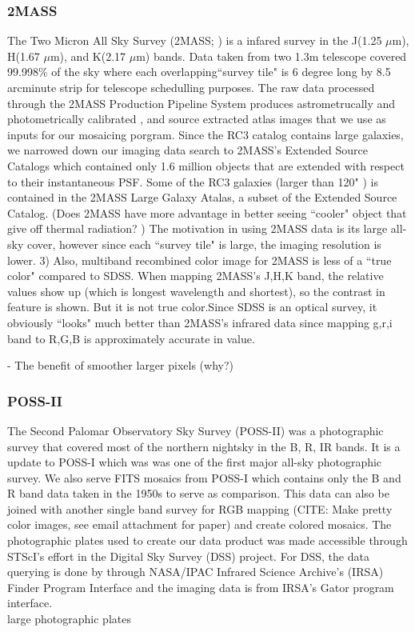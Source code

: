 \documentclass[5p]{elsarticle}
\begin{document}
	\subsubsection{2MASS}
	 The Two Micron All Sky Survey (2MASS; \citet{2mass}) is a infared survey in the J(1.25 $\mu$m), H(1.67 $\mu$m), and K(2.17 $\mu$m) bands. Data taken from two 1.3m telescope  covered 99.998\% of the sky where each overlapping``survey tile" is 6 degree long by 8.5 arcminute strip for telescope schedulling purposes. The raw data processed through the 2MASS Production Pipeline System produces astrometrucally and photometrically calibrated , and source extracted atlas images that we use as inputs for our mosaicing porgram. Since the RC3 catalog contains large galaxies, we narrowed down our imaging data search to  2MASS's  Extended Source Catalogs which contained only 1.6 million objects that are extended with respect to their instantaneous PSF. %
	 Some of the RC3 galaxies (larger than 120" ) is contained in the 2MASS Large Galaxy Atalas, a subset of the Extended Source Catalog.	(Does 2MASS have more advantage in better seeing ``cooler" object that give off thermal radiation? ) The motivation in using 2MASS data is its large all-sky cover, however since each ``survey tile" is large, the imaging resolution is lower. 3) Also, multiband recombined color image for 2MASS is less of a ``true color" compared to SDSS. When mapping 2MASS's J,H,K band, the relative values show up (which is longest wavelength and shortest), so the contrast in feature is shown. But it is not true color.Since  SDSS is an optical survey, it obviously ``looks" much better than 2MASS's infrared data since mapping g,r,i band to R,G,B is approximately accurate in value. 

 - The benefit of smoother larger pixels (why?)
	\subsubsection{POSS-II}
	The Second Palomar Observatory Sky Survey (POSS-II) was a photographic survey that covered most of the northern nightsky  in the B, R, IR bands.	It is a update to POSS-I which was 	was one of the first major all-sky photographic survey. We also serve FITS mosaics from POSS-I which contains only the B and R band data taken in the 1950s to serve as comparison. This data can also be joined with another single band survey  for RGB mapping (CITE: Make pretty color images, see email attachment for paper) and create colored mosaics. The photographic plates used to create our data product was made accessible through  STScI's effort in the Digital Sky Survey (DSS) project. For DSS, the data querying is done by  through NASA/IPAC Infrared Science Archive's  (IRSA) Finder Program Interface and the imaging data is from IRSA's  Gator program interface.
\\
\indent 
	large photographic plates 
	
\end{document}
